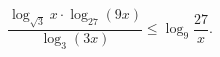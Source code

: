 \begin{ex}[type=inequality]
	\begin{condition}
		$\dfrac{\log_{\sqrt{3}} x \cdot\log_{27}(9x)}{\log_3(3x)}\leqslant\log_9 \dfrac{27}{x}  .$
	\end{condition}
\end{ex}